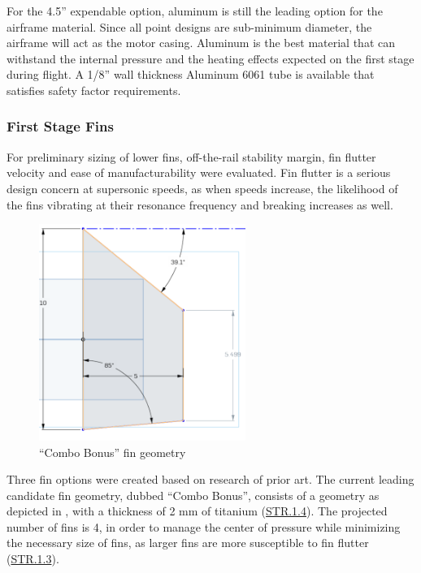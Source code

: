 For the 4.5'' expendable option, aluminum is still the leading option for the airframe material. Since all point designs are sub-minimum diameter, the airframe will act as the motor casing. Aluminum is the best material that can withstand the internal pressure and the heating effects expected on the first stage during flight. A 1/8'' wall thickness Aluminum 6061 tube is available that satisfies safety factor requirements.


\subsubsection{First Stage Fins} \label{section:s1-fins}

For preliminary sizing of lower fins, off-the-rail stability margin, fin flutter velocity and ease of manufacturability were evaluated. Fin flutter is a serious design concern at supersonic speeds, as when speeds increase, the likelihood of the fins vibrating at their resonance frequency and breaking increases as well.

\begin{figure}
    \centering
    \includegraphics[width=0.6\textwidth]{images/lower-fin-design}
    \caption{``Combo Bonus'' fin geometry}
    \label{figure:combo-bonus}
\end{figure}

Three fin options were created based on research of prior art. The current leading candidate fin geometry, dubbed ``Combo Bonus'', consists of a geometry as depicted in , with a thickness of 2 mm of titanium (\hyperlink{STR.1.4}{STR.1.4}). The projected number of fins is 4, in order to manage the center of pressure while minimizing the necessary size of fins, as larger fins are more susceptible to fin flutter (\hyperlink{STR.1.3}{STR.1.3}). 

